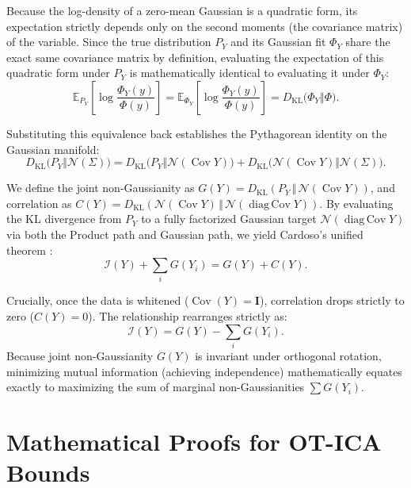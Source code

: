 \documentclass{tpm2026} %
\begin{document}
Because the log-density of a zero-mean Gaussian is a quadratic form, its expectation strictly depends only on the second moments (the covariance matrix) of the variable. Since the true distribution $P_Y$ and its Gaussian fit $\Phi_Y$ share the exact same covariance matrix by definition, evaluating the expectation of this quadratic form under $P_Y$ is mathematically identical to evaluating it under $\Phi_Y$:
\begin{equation}
    \mathbb{E}_{P_Y}\left[ \log \frac{\Phi_Y(y)}{\Phi(y)} \right] = \mathbb{E}_{\Phi_Y}\left[ \log \frac{\Phi_Y(y)}{\Phi(y)} \right] = D_{\mathrm{KL}}\big(\Phi_Y \Vert \Phi\big).
\end{equation}

Substituting this equivalence back establishes the Pythagorean identity on the Gaussian manifold:
\begin{equation}\label{eq:pythagoras_gaussian}
    D_{\mathrm{KL}}\big(P_Y \Vert \mathcal{N}(\Sigma)\big) = D_{\mathrm{KL}}\big(P_Y \Vert \mathcal{N}(\operatorname{Cov} Y)\big) + D_{\mathrm{KL}}\big(\mathcal{N}(\operatorname{Cov} Y) \Vert \mathcal{N}(\Sigma)\big).
\end{equation}

We define the joint non-Gaussianity as $G(Y) = D_{\mathrm{KL}}(P_Y \,\Vert\, \mathcal{N}(\operatorname{Cov} Y))$, and correlation as $C(Y) = D_{\mathrm{KL}}(\mathcal{N}(\operatorname{Cov} Y) \,\Vert\, \mathcal{N}(\operatorname{diag\,Cov} Y))$. By evaluating the KL divergence from $P_Y$ to a fully factorized Gaussian target $\mathcal{N}(\operatorname{diag\,Cov} Y)$ via both the Product path and Gaussian path, we yield Cardoso's unified theorem \citep{cardoso2022}:
\begin{equation}
    \mathscr{I}(Y) + \sum_{i} G(Y_i) = G(Y) + C(Y).
\end{equation}

Crucially, once the data is whitened ($\operatorname{Cov}(Y) = \mathbf{I}$), correlation drops strictly to zero ($C(Y) = 0$). The relationship rearranges strictly as:
\begin{equation}
    \mathscr{I}(Y) = G(Y) - \sum_{i} G(Y_i).
\end{equation}
Because joint non-Gaussianity $G(Y)$ is invariant under orthogonal rotation, minimizing mutual information (achieving independence) mathematically equates exactly to maximizing the sum of marginal non-Gaussianities $\sum G(Y_i)$.

\section{Mathematical Proofs for OT-ICA Bounds}
\label{app:proofs}
\end{document}
